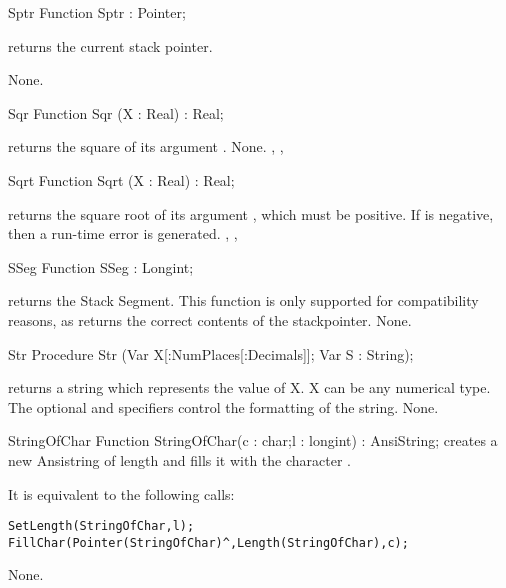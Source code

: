 \documentclass{report}
\begin{document}

\begin{function}{Sptr}
\Declaration
Function Sptr  : Pointer;

\Description
{} returns the current stack pointer.

\Errors
None.
\SeeAlso
{}
\end{function}


\begin{function}{Sqr}
\Declaration
Function Sqr (X : Real) : Real;

\Description
{} returns the square of its argument .
\Errors
None.
\SeeAlso
{}, , 
\end{function}


\begin{function}{Sqrt}
\Declaration
Function Sqrt (X : Real) : Real;

\Description
{} returns the square root of its argument , which must be
positive.
\Errors
If  is negative, then a run-time error is generated.
\SeeAlso
{}, , 
\end{function}


\begin{function}{SSeg}
\Declaration
Function SSeg  : Longint;

\Description
  returns the Stack Segment. This function is only
 supported for compatibility reasons, as  returns the
correct contents of the stackpointer.
\Errors
None.
\SeeAlso
{}
\end{function}


\begin{procedure}{Str}
\Declaration
Procedure Str (Var X[:NumPlaces[:Decimals]]; Var S : String);

\Description
{} returns a string which represents the value of X. X can be any
numerical type.
The optional  and  specifiers control the
formatting of the string.
\Errors
None.
\SeeAlso
{}
\end{procedure}


\begin{function}{StringOfChar}
\Declaration
Function StringOfChar(c : char;l : longint) : AnsiString;
\Description
{} creates a new Ansistring of length  and fills
it with the character .

It is equivalent to  the following calls:
\begin{verbatim}
SetLength(StringOfChar,l);
FillChar(Pointer(StringOfChar)^,Length(StringOfChar),c);
\end{verbatim}
\Errors
None.
\SeeAlso
{}
\end{function}
\end{document}
